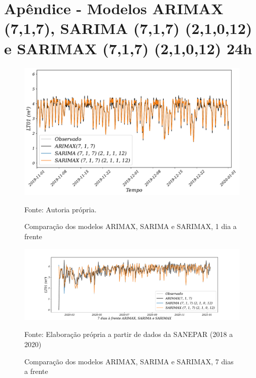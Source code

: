 
\section{Ap\^endice - Modelos ARIMAX (7,1,7), SARIMA (7,1,7) (2,1,0,12) e SARIMAX (7,1,7) (2,1,0,12) 24h}\label{sec:arimaxsarimasarimax24}

\begin{figure}[H]
	\centering
	\caption{Comparação dos modelos ARIMAX, SARIMA e SARIMAX, 1 dia a frente }
	\label{fig:1-ARIMAX-SARIMA-SARIMAX24}
	\includegraphics[width=1\linewidth]{Apendices/Figuras/modelagem-24h/1-ARIMAX-SARIMA-SARIMAX}
	
	Fonte: Autoria própria.
\end{figure}

\begin{figure}[H]
	\centering
	\caption{Comparação dos modelos ARIMAX, SARIMA e SARIMAX, 7 dias a frente }
	\label{fig:10-ARIMAX-SARIMA-SARIMAX24}
	\includegraphics[width=1\linewidth]{Apendices/Figuras/modelagem-24h/7-ARIMAX-SARIMA-SARIMAX}
	
Fonte: Elaboração própria a partir de dados da SANEPAR (2018 a 2020)
\end{figure}


